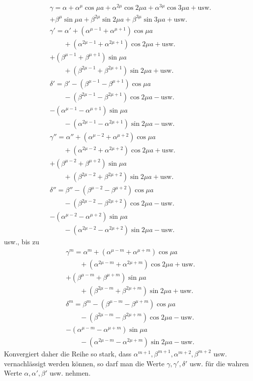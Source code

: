 \[
\begin{aligned}
&\gamma=\alpha+\alpha^{\mu}\cos\mu a+\alpha^{2\mu}\cos2\mu a+\alpha^{3\mu}\cos3\mu a+\mathrm{usw.}\\[5pt]
&+\beta^{\mu}\sin\mu a+\beta^{2\mu}\sin2\mu a+\beta^{3\mu}\sin3\mu a+\mathrm{usw.}\\[5pt]
&\gamma'=\alpha'+(\alpha^{\mu-1}+\alpha^{\mu+1})\cos\mu a\\[5pt]&\qquad{}+(\alpha^{2\mu-1}+\alpha^{2\mu+1})\cos2\mu a+\mathrm{usw.}\\[5pt]
&+(\beta^{\mu-1}+\beta^{\mu+1})\sin\mu a\\[5pt]&\qquad{}+(\beta^{2\mu-1}+\beta^{2\mu+1})\sin2\mu a+\mathrm{usw.}\\[5pt]
&\delta'=\beta'-(\beta^{\mu-1}-\beta^{\mu+1})\cos\mu a\\[5pt]&\qquad{}-(\beta^{2\mu-1}-\beta^{2\mu+1})\cos2\mu a-\mathrm{usw.}\\[5pt]
&-(\alpha^{\mu-1}-\alpha^{\mu+1})\sin\mu a\\[5pt]&\qquad{}-(\alpha^{2\mu-1}-\alpha^{2\mu+1})\sin2\mu a-\mathrm{usw.}\\[5pt]
&\gamma''=\alpha''+(\alpha^{\mu-2}+\alpha^{\mu+2})\cos\mu a\\[5pt]&\qquad{}+(\alpha^{2\mu-2}+\alpha^{2\mu+2})\cos2\mu a+\mathrm{usw.}\\[5pt]
&+(\beta^{\mu-2}+\beta^{\mu+2})\sin\mu a\\[5pt]&\qquad{}+(\beta^{2\mu-2}+\beta^{2\mu+2})\sin2\mu a+\mathrm{usw.}\\[5pt]
&\delta''=\beta''-(\beta^{\mu-2}-\beta^{\mu+2})\cos\mu a\\[5pt]&\qquad{}-(\beta^{2\mu-2}-\beta^{2\mu+2})\cos2\mu a-\mathrm{usw.}\\[5pt]
&-(\alpha^{\mu-2}-\alpha^{\mu+2})\sin\mu a\\[5pt]&\qquad{}-(\alpha^{2\mu-2}-\alpha^{2\mu+2})\sin2\mu a-\mathrm{usw.}
\end{aligned}
\]
usw., bis zu
\[
\begin{aligned}
&\gamma^m=\alpha^m+(\alpha^{\mu-m}+\alpha^{\mu+m})\cos\mu a\\[5pt]&\qquad{}+(\alpha^{2\mu-m}+\alpha^{2\mu+m})\cos2\mu a+\mathrm{usw.}\\[5pt]
&+(\beta^{\mu-m}+\beta^{\mu+m})\sin\mu a\\[5pt]&\qquad{}+(\beta^{2\mu-m}+\beta^{2\mu+m})\sin2\mu a+\mathrm{usw.}\\[5pt]
&\delta^m=\beta^m-(\beta^{\mu-m}-\beta^{\mu+m})\cos\mu a\\[5pt]&\qquad{}-(\beta^{2\mu-m}-\beta^{2\mu+m})\cos2\mu a-\mathrm{usw.}\\[5pt]
&-(\alpha^{\mu-m}-\alpha^{\mu+m})\sin\mu a\\[5pt]&\qquad{}-(\alpha^{2\mu-m}-\alpha^{2\mu+m})\sin2\mu a-\mathrm{usw.}
\end{aligned}
\]
Konvergiert daher die Reihe so stark, dass \(\alpha^{m+1},\beta^{m+1},\alpha^{m+2},\beta^{m+2}\) usw. vernachlässigt werden
können, so darf man die Werte \(\gamma,\gamma',\delta'\) usw. für die wahren Werte \(\alpha,\alpha',\beta'\) usw. nehmen.
\endgroup
